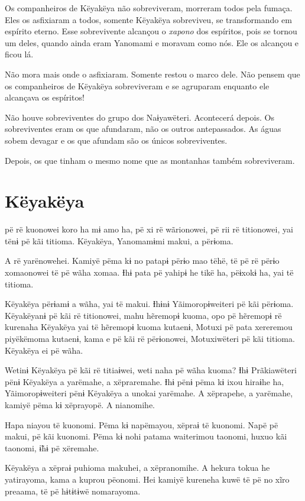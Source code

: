 Os companheiros de Këyakëya não sobreviveram, morreram todos pela
 fumaça. Eles os asfixiaram a todos, somente Këyakëya sobreviveu, se
 transformando em espírito eterno. Esse sobrevivente alcançou o \textit{xapono} dos
 espíritos, pois se tornou um deles, quando ainda eram Yanomami e moravam
 como nós. Ele os alcançou e ficou lá. 

Não mora mais onde o asfixiaram. Somente restou o marco dele. Não pensem
que os companheiros de Këyakëya sobreviveram e se agruparam enquanto ele
alcançava os espíritos! 

Não houve sobreviventes do grupo dos Naɨyawëteri. Acontecerá depois. Os
sobreviventes eram os que afundaram, não os outros antepassados. As
águas sobem devagar e os que afundam são os únicos sobreviventes. 


Depois, os que tinham o mesmo nome que as montanhas também
sobreviveram.

\chapter{Këyakëya}

 pë rë kuonowei koro ha mɨ amo ha, pë xi rë wãrionowei, pë rii rë
titionowei, yai tënɨ pë kãi titioma. Këyakëya, Yanomamɨmi makui, a
përɨoma. 

A rë yarënowehei. Kamiyë pëma kɨ no patapɨ përɨo mao tëhë, të pë rë
 përɨo xomaonowei të pë wãha xomaa. Ɨhɨ pata pë yahipɨ he tikë ha,
 pëɨxokɨ ha, yai të titioma. 

Këyakëya përɨamɨ a wãha, yai të makui. Ɨhɨnɨ Yãimoropɨweiteri pë kãi
përɨoma. Këyakëyanɨ pë kãi rë titionowei, mahu hẽremopɨ kuoma, opo pë
hẽremopɨ rë kurenaha Këyakëya yai të hẽremopɨ kuoma kutaenɨ, Motuxi pë
pata xereremou piyëkëmoma kutaenɨ, kama e pë kãi rë përɨonowei,
Motuxiwëteri pë kãi titioma. Këyakëya ei pë wãha. 

Wetinɨ Këyakëya pë kãi rë titiaɨwei, weti naha pë wãha kuoma? Ɨhɨ
Prãkiawëteri pënɨ Këyakëya a yarëmahe, a xëpraremahe. Ɨhɨ pënɨ pëma kɨ
ixou hiraɨhe ha, Yãimoropɨweiteri pënɨ Këyakëya a unokai yarëmahe. A xëprapehe, a yarëmahe, kamiyë pëma kɨ xëprayopë. A nianomihe. 

Hapa niayou të kuonomi. Pëma kɨ napëmayou, xëpraɨ të kuonomi. Napë pë
makui, pë kãi kuonomi. Pëma kɨ nohi patama waiterimou taonomi, huxuo kãi
taonomi, ɨ̃hɨ pë xëremahe. 

Këyakëya a xëpraɨ puhioma makuhei, a xëpranomihe. A hekura tokua he
 yatirayoma, kama a kuprou pëonomi. Hei kamiyë kureneha kuwë të pë no
 xĩro preaama, të pë hɨtɨtɨwë nomarayoma.

